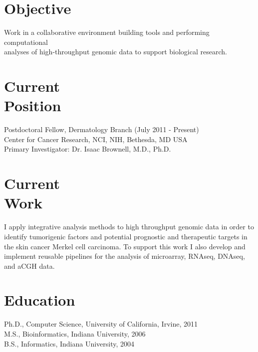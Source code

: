 \documentclass[margin,line]{res}
\begin{document}

\address{\textbf{E-mail:} kenny@kennydaily.net \textbf{Web:} www.kennydaily.net}
\address{10301 Grosvenor Place Apt 703, North Bethesda, MD 20852}

\begin{resume}


\section{\sc Objective}
Work in a collaborative environment building tools and performing computational\\
analyses of high-throughput genomic data to support biological research.

\section{\sc Current\\Position}
Postdoctoral Fellow, Dermatology Branch  (July 2011 - Present)\\
Center for Cancer Research, NCI, NIH, Bethesda, MD USA \\
Primary Investigator: Dr. Isaac Brownell, M.D., Ph.D.

\section{\sc Current\\Work}
I apply integrative analysis methods to high throughput genomic data in order to identify tumorigenic factors and potential prognostic and therapeutic targets in the skin cancer Merkel cell carcinoma.
To support this work I also develop and implement reusable pipelines for the analysis of microarray, RNAseq, DNAseq, and aCGH data.

\section{\sc Education}
Ph.D., Computer Science, University of California, Irvine, 2011\\%
M.S., Bioinformatics, Indiana University, 2006\\%
B.S., Informatics, Indiana University, 2004%


\end{resume}
\end{document}
